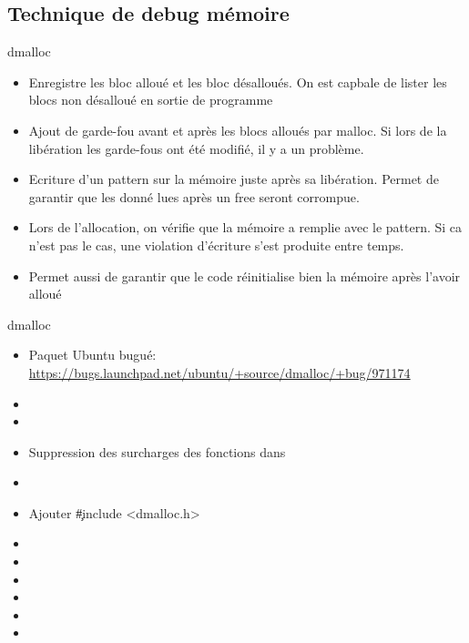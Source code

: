 \subsection{Technique de debug mémoire}

\begin{frame}[fragile=singleslide]{dmalloc}
  \begin{itemize}
  \item  Enregistre les  bloc alloué  et les  bloc désalloués.  On est
    capbale de lister les blocs non désalloué en sortie de programme
  \item  Ajout de  garde-fou  avant  et après  les  blocs alloués  par
    malloc. Si lors  de la libération les garde-fous  ont été modifié,
    il y a un problème.
  \item  Ecriture   d'un  pattern  sur  la  mémoire   juste  après  sa
    libération. Permet  de garantir que  les donné lues après  un free
    seront corrompue.
  \item Lors de l'allocation, on vérifie que la mémoire a remplie avec
    le pattern. Si ca n'est pas le cas, une violation d'écriture s'est
    produite entre temps.
  \item  Permet aussi  de garantir  que le  code réinitialise  bien la
    mémoire après l'avoir alloué
  \end{itemize}
\end{frame}

\begin{frame}[fragile=singleslide]{dmalloc}
  \begin{itemize} 
  \item Paquet Ubuntu bugué: \url{https://bugs.launchpad.net/ubuntu/+source/dmalloc/+bug/971174}
  \item {}
  \item {}
  \item Suppression des surcharges des fonctions dans 
  \item {}
  \item Ajouter \c{#include <dmalloc.h>}
  \item {}
  \item {}
  \item {}
  \item {}
  \item
  \item {}
  \end{itemize}
\end{frame}

